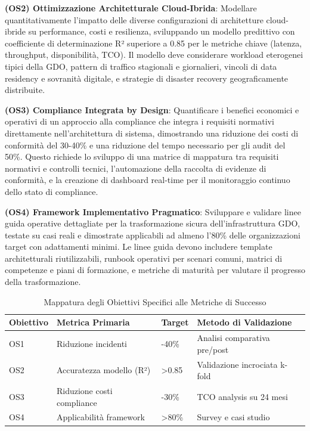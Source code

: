 \textbf{(OS2) Ottimizzazione Architetturale Cloud-Ibrida}: Modellare quantitativamente l'impatto delle diverse configurazioni di architetture cloud-ibride su performance, costi e resilienza, sviluppando un modello predittivo con coefficiente di determinazione R² superiore a 0.85 per le metriche chiave (latenza, throughput, disponibilità, TCO). Il modello deve considerare workload eterogenei tipici della GDO, pattern di traffico stagionali e giornalieri, vincoli di data residency e sovranità digitale, e strategie di disaster recovery geograficamente distribuite.

\textbf{(OS3) Compliance Integrata by Design}: Quantificare i benefici economici e operativi di un approccio alla compliance che integra i requisiti normativi direttamente nell'architettura di sistema, dimostrando una riduzione dei costi di conformità del 30-40\% e una riduzione del tempo necessario per gli audit del 50\%. Questo richiede lo sviluppo di una matrice di mappatura tra requisiti normativi e controlli tecnici, l'automazione della raccolta di evidenze di conformità, e la creazione di dashboard real-time per il monitoraggio continuo dello stato di compliance.

\textbf{(OS4) Framework Implementativo Pragmatico}: Sviluppare e validare linee guida operative dettagliate per la trasformazione sicura dell'infrastruttura GDO, testate su casi reali e dimostrate applicabili ad almeno l'80\% delle organizzazioni target con adattamenti minimi. Le linee guida devono includere template architetturali riutilizzabili, runbook operativi per scenari comuni, matrici di competenze e piani di formazione, e metriche di maturità per valutare il progresso della trasformazione.

\begin{table}[htbp]
\centering
\caption{Mappatura degli Obiettivi Specifici alle Metriche di Successo}
\label{tab:obiettivi_metriche}
\begin{tabular}{|l|l|l|l|}
\hline
\textbf{Obiettivo} & \textbf{Metrica Primaria} & \textbf{Target} & \textbf{Metodo di Validazione} \\
\hline
OS1 & Riduzione incidenti & -40\% & Analisi comparativa pre/post \\
\hline
OS2 & Accuratezza modello (R²) & >0.85 & Validazione incrociata k-fold \\
\hline
OS3 & Riduzione costi compliance & -30\% & TCO analysis su 24 mesi \\
\hline
OS4 & Applicabilità framework & >80\% & Survey e casi studio \\
\hline
\end{tabular}
\end{table}

